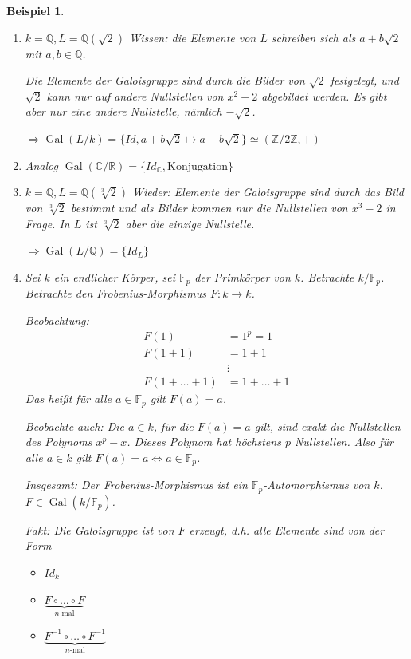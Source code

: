 \documentclass[a4paper,12pt,numbers=noenddot,parskip=full]{scrartcl}
\newcommand{\setZ}{\mathbb{Z}}
\newcommand{\setQ}{\mathbb{Q}}
\newcommand{\setR}{\mathbb{R}}
\newcommand{\setC}{\mathbb{C}}
\DeclareMathOperator{\Gal}{Gal}
\theoremstyle{dotless}
\newtheorem{example}[theorem]{Beispiel}
\theoremstyle{remark}
\begin{document}
	\begin{example}
		\begin{enumerate}
			\item $k = \setQ, L = \setQ(\sqrt{2})$ \textit{Wissen:} die Elemente von $L$ schreiben sich als $a + b \sqrt{2}$ mit $a,b \in \setQ$.
			
			Die Elemente der Galoisgruppe sind durch die Bilder von $\sqrt{2}$ festgelegt, und $\sqrt{2}$ kann nur auf andere Nullstellen von $x^2 - 2$ abgebildet werden. Es gibt aber nur eine andere Nullstelle, nämlich $- \sqrt{2}$.
			
			$\Rightarrow \Gal(L/k) = \{ Id, a + b\sqrt{2} \mapsto a - b\sqrt{2} \} \simeq (\setZ/2\setZ, +)$
			\item Analog $\Gal(\setC/\setR) = \{ Id_\setC, \text{Konjugation} \}$
			
			\item $k = \setQ, L = \setQ(\sqrt[3]{2})$ Wieder: Elemente der Galoisgruppe sind durch das Bild von $\sqrt[3]{2}$ bestimmt und als Bilder kommen nur die Nullstellen von $x^3 - 2$ in Frage. In $L$ ist $\sqrt[3]{2}$ aber die einzige Nullstelle.
			
			$\Rightarrow \Gal(L/\setQ) = \{ Id_L \}$
			
			\item Sei $k$ ein endlicher Körper, sei $\mathbb{F}_p$ der Primkörper von $k$. Betrachte $k/\mathbb{F}_p$. Betrachte den Frobenius-Morphismus $F: k \to k$. 
			
			\textit{Beobachtung:}
			\begin{align*}
				F(1) &= 1^p = 1 \\
				F(1 + 1) &= 1 + 1 \\
				&\vdots \\
				F(1 + \dots + 1) &= 1 + \dots + 1
			\end{align*}
			Das heißt für alle $a \in \mathbb{F}_p$ gilt $F(a) = a$.
			
			\textit{Beobachte auch:} Die $a \in k$, für die $F(a) = a$ gilt, sind exakt die Nullstellen des Polynoms $x^p - x$. Dieses Polynom hat höchstens $p$ Nullstellen. Also für alle $a \in k$ gilt $F(a) = a \Leftrightarrow a \in \mathbb{F}_p$.
			
			\textit{Insgesamt:} Der Frobenius-Morphismus ist ein $\mathbb{F}_p$-Automorphismus von $k$. $F \in \Gal(k/\mathbb{F}_p)$.
			
			\textit{Fakt:} Die Galoisgruppe ist von $F$ erzeugt, d.h. alle Elemente sind von der Form
			\begin{itemize}
				\item $Id_k$
				\item $\underbrace{F \circ \dots \circ F}_\text{$n$-mal}$
				\item $\underbrace{F^{-1} \circ \dots \circ F^{-1}}_\text{$n$-mal}$
			\end{itemize}
			
		\end{enumerate}
	\end{example}
\end{document}
